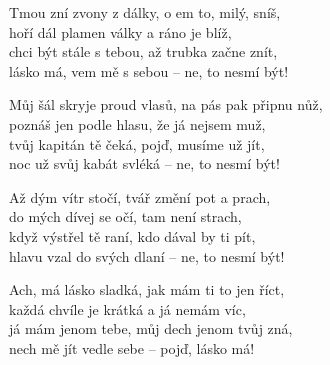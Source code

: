 
\ve{}
Tmou zní zvony z dálky, o em to, milý, sníš, \ \\
hoří dál plamen války a ráno je blíž,\\
chci být stále s tebou, až trubka začne znít, \ \\
lásko má, vem mě s sebou -- ne, to nesmí být!

\ve{}
Můj šál skryje proud vlasů, na pás pak připnu nůž,\\
poznáš jen podle hlasu, že já nejsem muž,\\
tvůj kapitán tě čeká, pojď, musíme už jít,\\
noc už svůj kabát svléká -- ne, to nesmí být!

\ve{}
Až dým vítr stočí, tvář změní pot a prach,\\
do mých dívej se očí, tam není strach,\\
když výstřel tě raní, kdo dával by ti pít,\\
hlavu vzal do svých dlaní -- ne, to nesmí být!

\ve{}
Ach, má lásko sladká, jak mám ti to jen říct,\\
každá chvíle je krátká a já nemám víc,\\
já mám jenom tebe, můj dech jenom tvůj zná,\\
nech mě jít vedle sebe -- pojď, lásko má!

\esong{}
